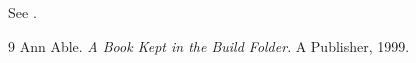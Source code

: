 \documentclass{article}
\begin{document}
See \cite{able}.
\begin{thebibliography}{9}
 Ann Able. \emph{A Book Kept in the Build Folder}. A Publisher, 1999.
\end{thebibliography}
\end{document}
